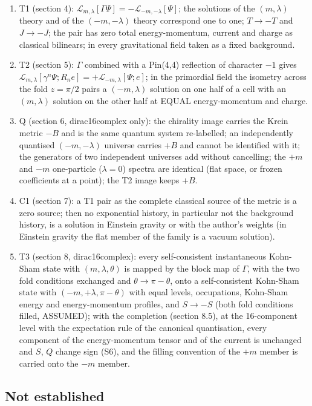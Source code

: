 \documentclass[11pt]{article}
\begin{document}
\begin{enumerate}
\item T1 (section 4): $\mathcal{L}_{m,\lambda}[\Gamma\Psi] = -\mathcal{L}_{-m,-\lambda}[\Psi]$; the solutions of the $(m,\lambda)$ theory and of the $(-m,-\lambda)$ theory correspond one to one; $T \to -T$ and $J \to -J$; the pair has zero total energy-momentum, current and charge as classical bilinears; in every gravitational field taken as a fixed background.
\item T2 (section 5): $\Gamma$ combined with a Pin(4,4) reflection of character $-1$ gives $\mathcal{L}_{m,\lambda}[\gamma^n\Psi; R_ne] = +\mathcal{L}_{-m,\lambda}[\Psi; e]$; in the primordial field the isometry across the fold $z = \pi/2$ pairs a $(-m,\lambda)$ solution on one half of a cell with an $(m,\lambda)$ solution on the other half at EQUAL energy-momentum and charge.
\item Q (section 6, dirac16complex only): the chirality image carries the Krein metric $-B$ and is the same quantum system re-labelled; an independently quantised $(-m,-\lambda)$ universe carries $+B$ and cannot be identified with it; the generators of two independent universes add without cancelling; the $+m$ and $-m$ one-particle ($\lambda = 0$) spectra are identical (flat space, or frozen coefficients at a point); the T2 image keeps $+B$.
\item C1 (section 7): a T1 pair as the complete classical source of the metric is a zero source; then no exponential history, in particular not the background history, is a solution in Einstein gravity or with the author's weights (in Einstein gravity the flat member of the family is a vacuum solution).
\item T3 (section 8, dirac16complex): every self-consistent instantaneous Kohn-Sham state with $(m,\lambda,\theta)$ is mapped by the block map of $\Gamma$, with the two fold conditions exchanged and $\theta \to \pi - \theta$, onto a self-consistent Kohn-Sham state with $(-m,+\lambda,\pi-\theta)$ with equal levels, occupations, Kohn-Sham energy and energy-momentum profiles, and $S \to -S$ (both fold conditions filled, ASSUMED); with the completion (section 8.5), at the 16-component level with the expectation rule of the canonical quantisation, every component of the energy-momentum tensor and of the current is unchanged and $S$, $Q$ change sign (S6), and the filling convention of the $+m$ member is carried onto the $-m$ member.
\end{enumerate}

\subsection{Not established}
\end{document}
